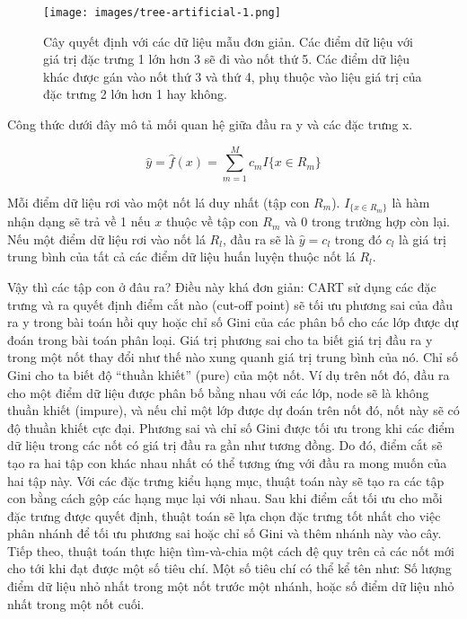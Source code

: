 \begin{figure*}[h!]
	\centering
	\texttt{[image: images/tree-artificial-1.png]}
	\label{fig:4_3_16}
	\caption{Cây quyết định với các dữ liệu mẫu đơn giản. Các điểm dữ liệu với giá trị đặc trưng 1 lớn hơn 3 sẽ đi vào nốt thứ 5. Các điểm dữ liệu khác được gán vào nốt thứ 3 và thứ 4, phụ thuộc vào liệu giá trị của đặc trưng 2 lớn hơn 1 hay không.}
	
\end{figure*}

Công thức dưới đây mô tả mối quan hệ giữa đầu ra y và các đặc trưng x.

$$\hat{y}=\hat{f}(x)=\sum_{m=1}^Mc_m{}I\{x\in{}R_m\}$$

Mỗi điểm dữ liệu rơi vào một nốt lá duy nhất (tập con $R_m$). $I_{\{x\in{}R_m\}}$ là hàm nhận dạng sẽ trả về 1 nếu $x$ thuộc về tập con $R_m$ và 0 trong trường hợp còn lại. Nếu một điểm dữ liệu rơi vào nốt lá $R_l$, đầu ra sẽ là $\hat{y}=c_l$ trong đó $c_l$ là giá trị trung bình của tất cả các điểm dữ liệu huấn luyện thuộc nốt lá $R_l$.

Vậy thì các tập con ở đâu ra? Điều này khá đơn giản: CART sử dụng các đặc trưng và ra quyết định điểm cắt nào (cut-off point) sẽ tối ưu phương sai của đầu ra y trong bài toán hồi quy hoặc chỉ số Gini của các phân bố cho các lớp được dự đoán trong bài toán phân loại. Giá trị phương sai cho ta biết giá trị đầu ra y trong một nốt thay đổi như thế nào xung quanh giá trị trung bình của nó. Chỉ số Gini cho ta biết độ ``thuần khiết'' (pure) của một nốt. Ví dụ trên nốt đó, đầu ra cho một điểm dữ liệu được phân bố bằng nhau với các lớp, node sẽ là không thuần khiết (impure), và nếu chỉ một lớp được dự đoán trên nốt đó, nốt này sẽ có độ thuần khiết cực đại. Phương sai và chỉ số Gini được tối ưu trong khi các điểm dữ liệu trong các nốt có giá trị đầu ra gần như tương đồng. Do đó, điểm cắt sẽ tạo ra hai tập con khác nhau nhất có thể tương ứng với đầu ra mong muốn của hai tập này. Với các đặc trưng kiểu hạng mục, thuật toán này sẽ tạo ra các tập con bằng cách gộp các hạng mục lại với nhau. Sau khi điểm cắt tối ưu cho mỗi đặc trưng được quyết định, thuật toán sẽ lựa chọn đặc trưng tốt nhất cho việc phân nhánh để tối ưu phương sai hoặc chỉ số Gini và thêm nhánh này vào cây. Tiếp theo, thuật toán thực hiện tìm-và-chia một cách đệ quy trên cả các nốt mới cho tới khi đạt được một số tiêu chí. Một số tiêu chí có thể kể tên như: Số lượng điểm dữ liệu nhỏ nhất trong một nốt trước một nhánh, hoặc số điểm dữ liệu nhỏ nhất trong một nốt cuối.


